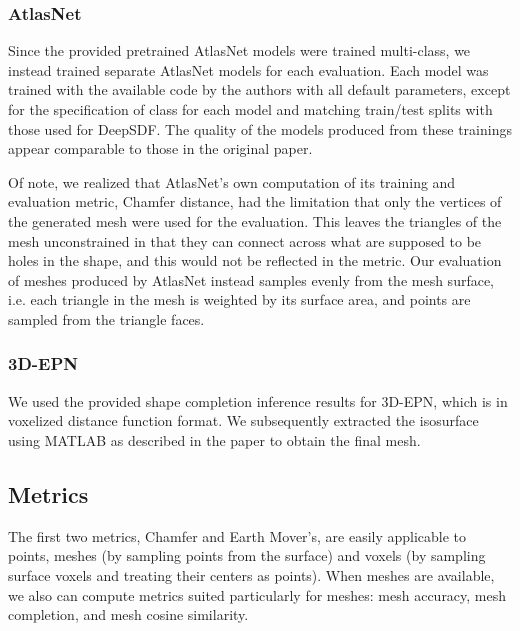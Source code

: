 \documentclass[10pt,twocolumn,letterpaper]{article}
\begin{document}
\subsubsection{AtlasNet}

Since the provided pretrained AtlasNet models were trained multi-class, we instead trained separate AtlasNet models for each evaluation.  Each model was trained with the available code by the authors with all default parameters, except for the specification of class for each model and matching train/test splits with those used for DeepSDF.  The quality of the models produced from these trainings appear comparable to those in the original paper.

Of note, we realized that AtlasNet's own computation of its training and evaluation metric, Chamfer distance, had the limitation that only the vertices of the generated mesh were used for the evaluation.  This leaves the triangles of the mesh unconstrained in that they can connect across what are supposed to be holes in the shape, and this would not be reflected in the metric.  Our evaluation of meshes produced by AtlasNet instead samples evenly from the mesh surface, i.e. each triangle in the mesh is weighted by its surface area, and points are sampled from the triangle faces.

\subsubsection{3D-EPN}

We used the provided shape completion inference results for 3D-EPN, which is in voxelized distance function format. We subsequently extracted the isosurface using MATLAB as described in the paper to obtain the final mesh.

\subsection{Metrics}\label{sec: metrics}

The first two metrics, Chamfer and Earth Mover's, are easily applicable to points, meshes (by sampling points from the surface) and voxels (by sampling surface voxels and treating their centers as points). When meshes are available, we also can compute metrics suited particularly for meshes: mesh accuracy, mesh completion, and mesh cosine similarity. \\ 
\end{document}
